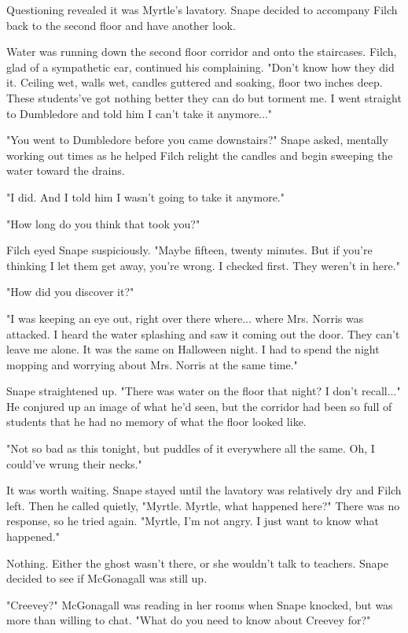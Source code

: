 \documentclass[a4paper,11pt]{article}
\begin{document}
Questioning revealed it was Myrtle's lavatory. Snape decided to accompany Filch back to the second floor and have another look.

Water was running down the second floor corridor and onto the staircases. Filch, glad of a sympathetic ear, continued his complaining. "Don't know how they did it. Ceiling wet, walls wet, candles guttered and soaking, floor two inches deep. These students've got nothing better they can do but torment me. I went straight to Dumbledore and told him I can't take it anymore..."

"You went to Dumbledore before you came downstairs?" Snape asked, mentally working out times as he helped Filch relight the candles and begin sweeping the water toward the drains.

"I did. And I told him I wasn't going to take it anymore."

"How long do you think that took you?"

Filch eyed Snape suspiciously. "Maybe fifteen, twenty minutes. But if you're thinking I let them get away, you're wrong. I checked first. They weren't in here."

"How did you discover it?"

"I was keeping an eye out, right over there where... where Mrs. Norris was attacked. I heard the water splashing and saw it coming out the door. They can't leave me alone. It was the same on Halloween night. I had to spend the night mopping and worrying about Mrs. Norris at the same time."

Snape straightened up. "There was water on the floor that night? I don't recall..." He conjured up an image of what he'd seen, but the corridor had been so full of students that he had no memory of what the floor looked like.

"Not so bad as this tonight, but puddles of it everywhere all the same. Oh, I could've wrung their necks."

It was worth waiting. Snape stayed until the lavatory was relatively dry and Filch left. Then he called quietly, "Myrtle. Myrtle, what happened here?" There was no response, so he tried again. "Myrtle, I'm not angry. I just want to know what happened."

Nothing. Either the ghost wasn't there, or she wouldn't talk to teachers. Snape decided to see if McGonagall was still up.

"Creevey?" McGonagall was reading in her rooms when Snape knocked, but was more than willing to chat. "What do you need to know about Creevey for?"
\end{document}
